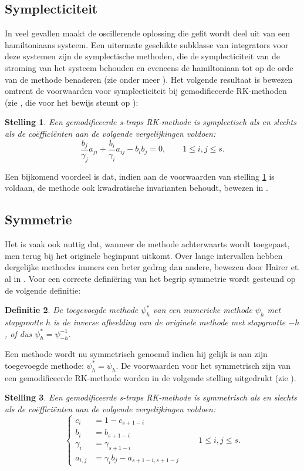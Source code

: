 \documentclass[12pt]{article}
\newtheorem{defn}{Definitie}
\newtheorem{stl}[defn]{Stelling}
\begin{document}
\subsection{Symplecticiteit}
In veel gevallen maakt de oscillerende oplossing die gefit wordt deel uit van een hamiltoniaans systeem. Een uitermate geschikte subklasse van integrators voor deze systemen zijn de symplectische methoden, die de symplecticiteit van de stroming van het systeem behouden en eveneens de hamiltoniaan tot op de orde van de methode benaderen (zie onder meer \cite{wiskmod}). Het volgende resultaat is bewezen omtrent de voorwaarden voor symplecticiteit bij gemodificeerde RK-methoden (zie \cite{4thordersympl}, die voor het bewijs steunt op \cite{numhamsys}):
\begin{stl} \label{stl:symp}
Een gemodificeerde s-traps RK-methode is symplectisch als en slechts als de coëfficiënten aan de volgende vergelijkingen voldoen:
\begin{equation*}
    \frac{b_j}{\gamma_j}a_{ji}+\frac{b_i}{\gamma_i}a_{ij}-b_ib_j=0,\qquad 1\le i,j\le s.
\end{equation*}
\end{stl}
Een bijkomend voordeel is dat, indien aan de voorwaarden van stelling \ref{stl:symp} is voldaan, de methode ook kwadratische invarianten behoudt, bewezen in \cite{structpreserv}.

\subsection{Symmetrie}
Het is vaak ook nuttig dat, wanneer de methode achterwaarts wordt toegepast, men terug bij het originele beginpunt uitkomt. Over lange intervallen hebben dergelijke methodes immers een beter gedrag dan andere, bewezen door Hairer et. al in \cite{strucpresalg}. Voor een correcte definiëring van het begrip symmetrie wordt gesteund op de volgende definitie:
\begin{defn}
De toegevoegde methode \(\psi_h^*\) van een numerieke methode \(\psi_h\) met stapgrootte \(h\) is de inverse afbeelding van de originele methode met stapgrootte \(-h\), of dus \(\psi_h^*=\psi_{-h}^{-1}\).
\end{defn}
Een methode wordt nu symmetrisch genoemd indien hij gelijk is aan zijn toegevoegde methode: \(\psi_h^*=\psi_h\). De voorwaarden voor het symmetrisch zijn van een gemodificeerde RK-methode worden in de volgende stelling uitgedrukt (zie \cite{6thordersympl}).
\begin{stl} \label{stl:symm}
Een gemodificeerde s-traps RK-methode is symmetrisch als en slechts als de coëfficiënten aan de volgende vergelijkingen voldoen:
\begin{equation*}
    \begin{cases}
        c_i&=1-c_{s+1-i} \\
        b_i&=b_{s+1-i} \\
        \gamma_i&=\gamma_{s+1-i} \\
        a_{i,j}&=\gamma_i b_j-a_{s+1-i,s+1-j}
    \end{cases}\qquad 1\le i,j\le s.
\end{equation*}
\end{stl}
\end{document}
